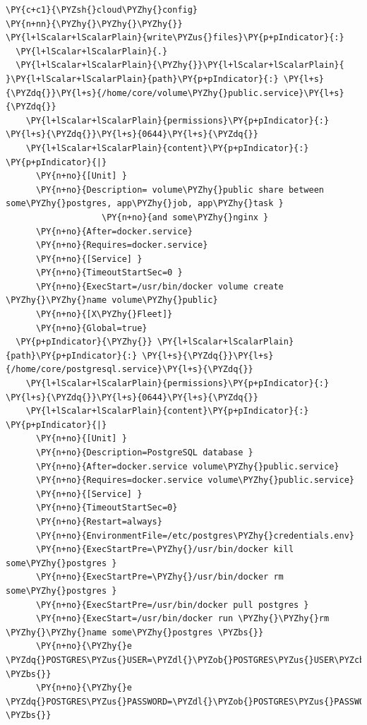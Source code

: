\begin{codelisting}
\label{code:vagrantfile2}
\begin{Verbatim}[fontsize=\relsize{-2.5},fontseries=b,commandchars=\\\{\}]
\PY{c+c1}{\PYZsh{}cloud\PYZhy{}config}
\PY{n+nn}{\PYZhy{}\PYZhy{}\PYZhy{}}
\PY{l+lScalar+lScalarPlain}{write\PYZus{}files}\PY{p+pIndicator}{:}
  \PY{l+lScalar+lScalarPlain}{.}
  \PY{l+lScalar+lScalarPlain}{\PYZhy{}}\PY{l+lScalar+lScalarPlain}{ }\PY{l+lScalar+lScalarPlain}{path}\PY{p+pIndicator}{:} \PY{l+s}{\PYZdq{}}\PY{l+s}{/home/core/volume\PYZhy{}public.service}\PY{l+s}{\PYZdq{}}
    \PY{l+lScalar+lScalarPlain}{permissions}\PY{p+pIndicator}{:} \PY{l+s}{\PYZdq{}}\PY{l+s}{0644}\PY{l+s}{\PYZdq{}}
    \PY{l+lScalar+lScalarPlain}{content}\PY{p+pIndicator}{:} \PY{p+pIndicator}{|}
      \PY{n+no}{[Unit] }
      \PY{n+no}{Description= volume\PYZhy{}public share between some\PYZhy{}postgres, app\PYZhy{}job, app\PYZhy{}task }
                   \PY{n+no}{and some\PYZhy{}nginx }
      \PY{n+no}{After=docker.service}
      \PY{n+no}{Requires=docker.service}
      \PY{n+no}{[Service] }
      \PY{n+no}{TimeoutStartSec=0 }
      \PY{n+no}{ExecStart=/usr/bin/docker volume create \PYZhy{}\PYZhy{}name volume\PYZhy{}public}
      \PY{n+no}{[X\PYZhy{}Fleet]}
      \PY{n+no}{Global=true}
  \PY{p+pIndicator}{\PYZhy{}} \PY{l+lScalar+lScalarPlain}{path}\PY{p+pIndicator}{:} \PY{l+s}{\PYZdq{}}\PY{l+s}{/home/core/postgresql.service}\PY{l+s}{\PYZdq{}}
    \PY{l+lScalar+lScalarPlain}{permissions}\PY{p+pIndicator}{:} \PY{l+s}{\PYZdq{}}\PY{l+s}{0644}\PY{l+s}{\PYZdq{}}
    \PY{l+lScalar+lScalarPlain}{content}\PY{p+pIndicator}{:} \PY{p+pIndicator}{|}
      \PY{n+no}{[Unit] }
      \PY{n+no}{Description=PostgreSQL database }
      \PY{n+no}{After=docker.service volume\PYZhy{}public.service}
      \PY{n+no}{Requires=docker.service volume\PYZhy{}public.service}
      \PY{n+no}{[Service] }
      \PY{n+no}{TimeoutStartSec=0}
      \PY{n+no}{Restart=always}
      \PY{n+no}{EnvironmentFile=/etc/postgres\PYZhy{}credentials.env}
      \PY{n+no}{ExecStartPre=\PYZhy{}/usr/bin/docker kill some\PYZhy{}postgres }
      \PY{n+no}{ExecStartPre=\PYZhy{}/usr/bin/docker rm some\PYZhy{}postgres }
      \PY{n+no}{ExecStartPre=/usr/bin/docker pull postgres }
      \PY{n+no}{ExecStart=/usr/bin/docker run \PYZhy{}\PYZhy{}rm \PYZhy{}\PYZhy{}name some\PYZhy{}postgres \PYZbs{}}
      \PY{n+no}{\PYZhy{}e \PYZdq{}POSTGRES\PYZus{}USER=\PYZdl{}\PYZob{}POSTGRES\PYZus{}USER\PYZcb{}\PYZdq{} \PYZbs{}}
      \PY{n+no}{\PYZhy{}e \PYZdq{}POSTGRES\PYZus{}PASSWORD=\PYZdl{}\PYZob{}POSTGRES\PYZus{}PASSWORD\PYZcb{}\PYZdq{} \PYZbs{}}

\end{Verbatim}
\end{codelisting}
